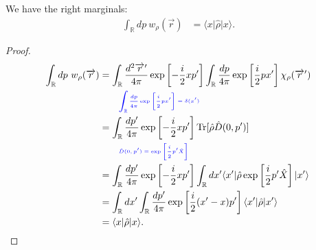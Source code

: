 \documentclass[../../note.tex]{subfiles}
\begin{document}
\begin{lemma}
    We have the right marginals:
    \begin{align}
        \int_{\mathbb{R}}d p~w_{\rho}(\overrightarrow{r}) 
        &= \langle x \vert \hat{\rho} \vert x \rangle.
    \end{align}
\end{lemma}
\begin{proof}
    \begin{align}
        \int_{\mathbb{R}}d p~w_{\rho}(\overrightarrow{r}) 
        &= \int_{\mathbb{R}} \frac{d^2 \overrightarrow{r}^\prime}{4 \pi} \exp\left[- \frac{i}{2} x p^\prime \right] \int_{\mathbb{R}} \frac{d p}{4 \pi} \exp\left[\frac{i}{2}p x^\prime\right] \chi_{\rho}(\overrightarrow{r}^\prime) \\
        &\qquad\text{\color{blue}{\tiny\sffamily $\int_{\mathbb{R}} \frac{d p}{4 \pi} \exp\left[\frac{i}{2}p x^\prime\right] = \delta(x^\prime)$}} \nonumber \\
        &= \int_{\mathbb{R}} \frac{d p^\prime}{4 \pi} \exp\left[- \frac{i}{2} x p^\prime\right] \operatorname{Tr}[\hat{\rho} \hat{D}(0, p^\prime)] \\
        &\qquad\text{\color{blue}{\tiny\sffamily $\hat{D}(0, p^\prime) = \exp\left[\frac{i}{2} p^\prime \hat{X} \right]$}} \nonumber \\
        &= \int_{\mathbb{R}} \frac{d p^\prime}{4 \pi} \exp\left[- \frac{i}{2} x p^\prime\right] \int_{\mathbb{R}} d x^\prime \langle x^\prime \vert \hat{\rho} \exp\left[\frac{i}{2} p^\prime \hat{X} \right] \vert x^\prime \rangle \\
        &= \int_{\mathbb{R}} d x^\prime \int_{\mathbb{R}} \frac{d p^\prime}{4 \pi} \exp\left[\frac{i}{2} (x^\prime - x)p^\prime\right] \langle x^\prime \vert \hat{\rho} \vert x' \rangle \\
        &= \langle x \vert \hat{\rho} \vert x \rangle.
    \end{align}
\end{proof}
\end{document}
